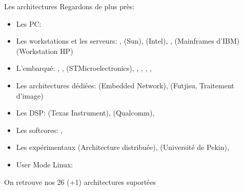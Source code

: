 \begin{frame}[fragile=singleslide]{Les architectures}
  Regardons  de plus près:
  \begin{itemize} 
  \item Les PC: 
  \item Les  workstations et les  serveurs: , 
    (Sun),        (Intel),   ,    
    (Mainframes d'IBM)  (Workstation HP)
  \item     L'embarqué:     ,     ,     
    (STMicroelectronics),   ,  ,  ,
    ,  
  \item  Les architectures  dédiées:   (Embedded  Network),
     (Futjisu, Traitement d'image)
  \item  Les   DSP:    (Texas   Instrument),  
    (Qualcomm), 
  \item Les softcores: , 
  \item  Les   expérimentaux    (Architecture  distribuée),
     (Université de Pekin), 
  \item User Mode Linux: 
  \end{itemize} 
  On retrouve nos 26 (+1) architectures suportées
\end{frame}    

